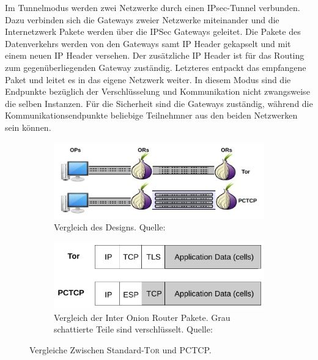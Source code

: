 \documentclass[fleqn,envcountsame,runningheads,10pt,a4paper]{llncs}
\begin{document}
Im Tunnelmodus werden zwei Netzwerke durch einen IPsec-Tunnel verbunden. Dazu verbinden sich die Gateways zweier Netzwerke miteinander und die Internetzwerk Pakete werden über die IPSec Gateways geleitet. Die Pakete des Datenverkehrs werden von den Gateways samt IP Header gekapselt und mit einem neuen IP Header versehen. Der zusätzliche IP Header ist für das Routing zum gegenüberliegenden Gateway zuständig. Letzteres entpackt das empfangene Paket und leitet es in das eigene Netzwerk weiter. In diesem Modus sind die Endpunkte bezüglich der Verschlüsselung und Kommunikation nicht zwangsweise die selben Instanzen. Für die Sicherheit sind die Gateways zuständig, während die Kommunikationsendpunkte beliebige Teilnehmner aus den beiden Netzwerken sein können.

\begin{figure}[h]
  \centering
  \begin{subfigure}[t]{0.46\textwidth}
    \includegraphics[width=\textwidth]{pics/PCTCP_design.pdf}
    \caption{Vergleich des Designs. Quelle: \cite{pctcp}}
    \label{fig:pctcpdesign}
  \end{subfigure}
  \begin{subfigure}[t]{0.46\textwidth}
    \includegraphics[width=\textwidth]{pics/PCTCP_header.pdf}
    \caption{Vergleich der Inter Onion Router Pakete. Grau schattierte Teile sind verschlüsselt. Quelle:\cite{pctcp}}
    \label{fig:pctcpheader}
  \end{subfigure}
  \caption{Vergleiche Zwischen Standard-\textsc{Tor} und PCTCP.}
\end{figure}
\end{document}
